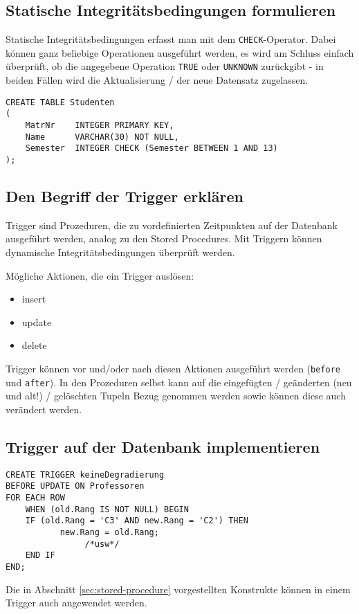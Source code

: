 \subsection{Statische Integritätsbedingungen formulieren}
Statische Integritätsbedingungen erfasst man mit dem \texttt{CHECK}-Operator. Dabei können ganz beliebige Operationen ausgeführt werden, es wird am Schluss einfach überprüft, ob die angegebene Operation \texttt{TRUE} oder \texttt{UNKNOWN} zurückgibt - in beiden Fällen wird die Aktualisierung / der neue Datensatz zugelassen.

\begin{lstlisting}[caption={Beispiel mit CHECK}]
CREATE TABLE Studenten
(
    MatrNr    INTEGER PRIMARY KEY,
    Name      VARCHAR(30) NOT NULL,
    Semester  INTEGER CHECK (Semester BETWEEN 1 AND 13)
);
\end{lstlisting}

\subsection{Den Begriff der Trigger erklären}
Trigger sind Prozeduren, die zu vordefinierten Zeitpunkten auf der Datenbank ausgeführt werden, analog zu den Stored Procedures. Mit Triggern können dynamische Integritätsbedingungen überprüft werden.

Mögliche Aktionen, die ein Trigger auslösen:

\begin{itemize}
  \item insert
  \item update
  \item delete
\end{itemize}

Trigger können vor und/oder nach diesen Aktionen ausgeführt werden (\texttt{before} und \texttt{after}). In den Prozeduren selbst kann auf die eingefügten / geänderten (neu und alt!) / gelöschten Tupeln Bezug genommen werden sowie können diese auch verändert werden.

\subsection{Trigger auf der Datenbank implementieren}

\begin{lstlisting}[caption={Trigger Beispiel SQL}]
CREATE TRIGGER keineDegradierung
BEFORE UPDATE ON Professoren
FOR EACH ROW
    WHEN (old.Rang IS NOT NULL) BEGIN
    IF (old.Rang = 'C3' AND new.Rang = 'C2') THEN
           new.Rang = old.Rang;
                /*usw*/
    END IF
END;
\end{lstlisting}

Die in Abschnitt \ref{sec:stored-procedure} vorgestellten Konstrukte können in einem Trigger auch angewendet werden.